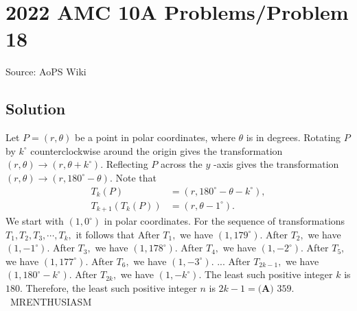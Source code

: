 \documentclass[12pt]{article}
\begin{document}
\section*{{2022 AMC 10A Problems/Problem 18}}
Source: AoPS Wiki

\subsection*{Solution}
Let $P=(r,\theta)$ be a point in polar coordinates, where $\theta$ is in degrees. Rotating $P$ by $k^{\circ}$ counterclockwise around the origin gives the transformation $(r,\theta)\rightarrow(r,\theta+k^{\circ}).$ Reflecting $P$ across the $y$ -axis gives the transformation $(r,\theta)\rightarrow(r,180^{\circ}-\theta).$ Note that \begin{align*} T_k(P)&=(r,180^{\circ}-\theta-k^{\circ}), \\ T_{k+1}(T_k(P)) &= (r,\theta -1^{\circ}). \end{align*} We start with $(1,0^{\circ})$ in polar coordinates. For the sequence of transformations $T_1, T_2, T_3, \cdots, T_k,$ it follows that After $T_1,$ we have $(1,179^{\circ}).$ After $T_2,$ we have $(1,-1^{\circ}).$ After $T_3,$ we have $(1,178^{\circ}).$ After $T_4,$ we have $(1,-2^{\circ}).$ After $T_5,$ we have $(1,177^{\circ}).$ After $T_6,$ we have $(1,-3^{\circ}).$ ... After $T_{2k-1},$ we have $(1,180^{\circ}-k^{\circ}).$ After $T_{2k},$ we have $(1,-k^{\circ}).$ The least such positive integer $k$ is $180.$ Therefore, the least such positive integer $n$ is $2k-1=\boxed{\textbf{(A) } 359}.$ ~MRENTHUSIASM
\end{document}
